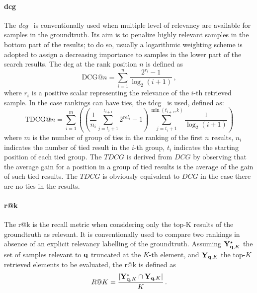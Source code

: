 \paragraph{\acrlong{dcg}}
The \emph{\acrfull{dcg}}~\cite{jarvelin2002cumulated} is conventionally used when multiple level of relevancy are available for samples in the groundtruth.
Its aim is to penalize highly relevant samples in the bottom part of the results;
to do so, usually a logarithmic weighting scheme is adopted to assign a decreasing importance to samples in the lower part of the search results.
The \gls{dcg} at the rank position $n$ is defined as
\begin{equation} \label{eq:back:dcg}
    \text{DCG}@n = \sum_{i=1}^n \frac{2^{r_i} - 1}{\log_2(i + 1)} \,,
\end{equation}
where $r_i$ is a positive scalar representing the relevance of the $i$-th retrieved sample.
In the case rankings can have ties, the \gls{tdcg}~\cite{mcsherry2008computing} is used, defined as:
%
\begin{equation}
\text{TDCG}@n = \sum_{i=1}^{m}\left(\left(\frac{1}{n_i}\sum_{j=t_i+1}^{t_{i+1}}2^{rel_i}-1\right)\sum_{j=t_i+1}^{\min(t_{i+1},k)}\frac{1}{\log_2(i+1)}\right)
\end{equation}
%
where $m$ is the number of group of ties in the ranking of the first $n$ results, $n_i$ indicates the number of tied result in the $i$-th group, $t_i$ indicates the starting position of each tied group.
The $TDCG$ is derived from $DCG$ by observing that the average gain for a position in a group of tied results is the average of the gain of such tied results.
The $TDCG$ is obviously equivalent to $DCG$ in the case there are no ties in the results.


\paragraph{\acrlong{r@k}}
The \acrfull{r@k} is the recall metric when considering only the top-K results of the groundtruth as relevant.
It is conventionally used to compare two rankings in absence of an explicit relevancy labelling of the groundtruth.
Assuming $\mathbf{Y}^{\star}_{\mathbf{q}, K}$ the set of samples relevant to $\mathbf{q}$ truncated at the $K$-th element, and $\mathbf{Y}_{\mathbf{q},K}$ the top-$K$ retrieved elements to be evaluated, the \gls{r@k} is defined as
\begin{equation} \label{eq:back:r@k}
    R@K = \frac{|\mathbf{Y}^{\star}_{\mathbf{q}, K} \cap \mathbf{Y}_{\mathbf{q},K}|}{K} \,.
\end{equation}

